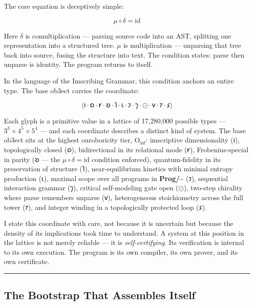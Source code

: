 \documentclass[12pt,a4paper]{article}
\begin{document}
The core equation is deceptively simple:

\[\mu \circ \delta = \mathrm{id}\]

Here $\delta$ is comultiplication --- parsing source code into an AST, splitting one representation into a structured tree. $\mu$ is multiplication --- unparsing that tree back into source, fusing the structure into text. The condition states: parse then unparse is identity. The program returns to itself.

In the language of the Imscribing Grammar, this condition anchors an entire type. The base ob3ect carries the coordinate:

\[\langle \text{𐑦} \cdot \text{𐑸} \cdot \text{𐑾} \cdot \text{𐑹} \cdot \text{𐑐} \cdot \text{𐑧} \cdot \text{𐑲} \cdot \text{𐑠} \cdot \odot \cdot \text{𐑫} \cdot \text{𐑳} \cdot \text{𐑭} \rangle\]

Each glyph is a primitive value in a lattice of 17,280,000 possible types --- $3^3 \times 4^5 \times 5^4$ --- and each coordinate describes a distinct kind of system. The base ob3ect sits at the highest ouroboricity tier, $\text{O}_{\text{inf}}$: imscriptive dimensionality ($\text{𐑦}$), topologically closed ($\text{𐑸}$), bidirectional in its relational mode ($\text{𐑾}$), Frobenius-special in parity ($\text{𐑹}$ --- the $\mu\circ\delta = \mathrm{id}$ condition enforced), quantum-fidelity in its preservation of structure ($\text{𐑐}$), near-equilibrium kinetics with minimal entropy production ($\text{𐑧}$), maximal scope over all programs in \textbf{Prog/\textasciitilde{}} ($\text{𐑲}$), sequential interaction grammar ($\text{𐑠}$), critical self-modeling gate open ($\odot$), two-step chirality where parse remembers unparse ($\text{𐑫}$), heterogeneous stoichiometry across the full tower ($\text{𐑳}$), and integer winding in a topologically protected loop ($\text{𐑭}$).

I state this coordinate with care, not because it is uncertain but because the density of its implications took time to understand. A system at this position in the lattice is not merely reliable --- it is \emph{self-certifying}. Its verification is internal to its own execution. The program is its own compiler, its own prover, and its own certificate.

\begin{center}
\rule{0.5\textwidth}{0.4pt}
\end{center}

\subsection{The Bootstrap That Assembles Itself}
\end{document}
